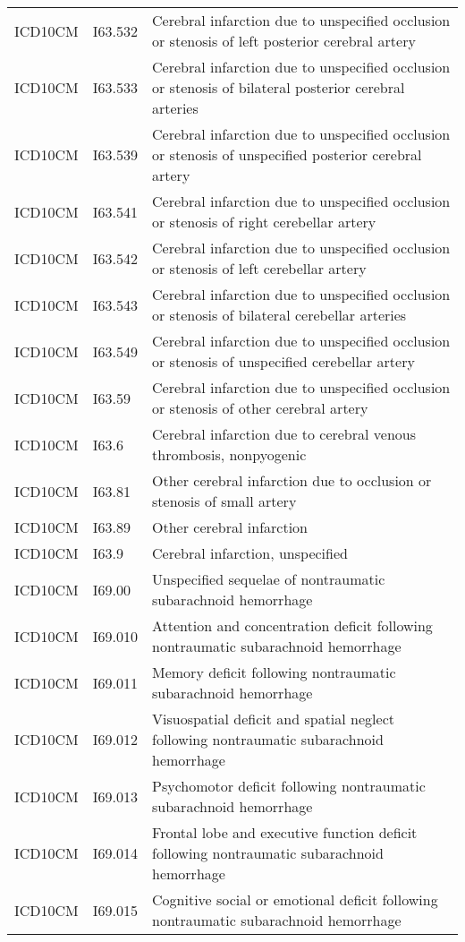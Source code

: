\begin{longtable}{p{}p{}p{}}
  ICD10CM & I63.532 & Cerebral infarction due to unspecified occlusion or stenosis of left posterior cerebral artery \\ 
  ICD10CM & I63.533 & Cerebral infarction due to unspecified occlusion or stenosis of bilateral posterior cerebral arteries \\ 
  ICD10CM & I63.539 & Cerebral infarction due to unspecified occlusion or stenosis of unspecified posterior cerebral artery \\ 
  ICD10CM & I63.541 & Cerebral infarction due to unspecified occlusion or stenosis of right cerebellar artery \\ 
  ICD10CM & I63.542 & Cerebral infarction due to unspecified occlusion or stenosis of left cerebellar artery \\ 
  ICD10CM & I63.543 & Cerebral infarction due to unspecified occlusion or stenosis of bilateral cerebellar arteries \\ 
  ICD10CM & I63.549 & Cerebral infarction due to unspecified occlusion or stenosis of unspecified cerebellar artery \\ 
  ICD10CM & I63.59 & Cerebral infarction due to unspecified occlusion or stenosis of other cerebral artery \\ 
  ICD10CM & I63.6 & Cerebral infarction due to cerebral venous thrombosis, nonpyogenic \\ 
  ICD10CM & I63.81 & Other cerebral infarction due to occlusion or stenosis of small artery \\ 
  ICD10CM & I63.89 & Other cerebral infarction \\ 
  ICD10CM & I63.9 & Cerebral infarction, unspecified \\ 
  ICD10CM & I69.00 & Unspecified sequelae of nontraumatic subarachnoid hemorrhage \\ 
  ICD10CM & I69.010 & Attention and concentration deficit following nontraumatic subarachnoid hemorrhage \\ 
  ICD10CM & I69.011 & Memory deficit following nontraumatic subarachnoid hemorrhage \\ 
  ICD10CM & I69.012 & Visuospatial deficit and spatial neglect following nontraumatic subarachnoid hemorrhage \\ 
  ICD10CM & I69.013 & Psychomotor deficit following nontraumatic subarachnoid hemorrhage \\ 
  ICD10CM & I69.014 & Frontal lobe and executive function deficit following nontraumatic subarachnoid hemorrhage \\ 
  ICD10CM & I69.015 & Cognitive social or emotional deficit following nontraumatic subarachnoid hemorrhage \\ 

\end{longtable}
